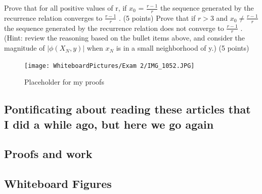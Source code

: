 Prove that for all positive values of r, if $x_0$ =
$\frac{r-1}{r}$
 the sequence generated by the recurrence relation
converges to $\frac{r-1}{r}$
. (5 points)
Prove that if $r>3$ and $x_0 \neq \frac{r-1}{r}$the sequence generated by the recurrence relation does not
converge to $\frac{r-1}{r}$
. (Hint: review the reasoning based on the bullet items above, and consider the
magnitude of $|\phi (X_N,y)|$ when  $x_N$  is in a small neighborhood of   y.) (5 points)
\begin{figure}[h]\begin{center}\texttt{[image: WhiteboardPictures/Exam 2/IMG\_1052.JPG]}
\caption{Placeholder for my proofs} \label{fig:Euler_pic}\end{center}\end{figure} 

\subsection{Pontificating about reading these articles that I did a while ago, but here we go again}


\subsection{Proofs and work}


\subsection{Whiteboard Figures}
\begin{figure}[ht]\end{figure} 



